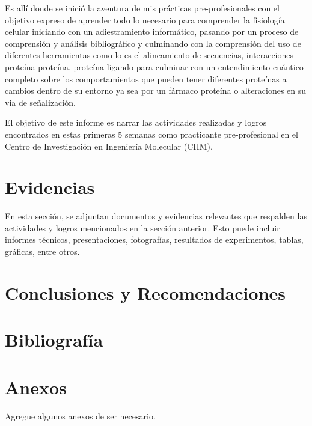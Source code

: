 \documentclass[a4paper, 12pt]{article}
\begin{document}
Es allí donde se inició la aventura de mis prácticas pre-profesionales con el objetivo expreso de aprender todo lo necesario para comprender la fisiología celular iniciando con un adiestramiento informático, pasando por un proceso de comprensión y análisis bibliográfico y culminando con la comprensión del uso de diferentes herramientas como lo es el alineamiento de secuencias, interacciones proteína-proteína, proteína-ligando para culminar con un entendimiento cuántico completo sobre los comportamientos que pueden tener diferentes proteínas a cambios dentro de su entorno ya sea por un fármaco proteína o alteraciones en su via de señalización.
   
El objetivo de este informe es narrar las actividades realizadas y logros encontrados en estas primeras 5 semanas como practicante pre-profesional en el Centro de Investigación en Ingeniería Molecular (CIIM).


\section{Evidencias}
En esta sección, se adjuntan documentos y evidencias relevantes que respalden las actividades y logros mencionados en la sección anterior. Esto puede incluir informes técnicos, presentaciones, fotografías, resultados de experimentos, tablas, gráficas, entre otros.

\section{Conclusiones y Recomendaciones}




\section{Bibliografía}




\section{Anexos}
Agregue algunos anexos de ser necesario.
\end{document}
